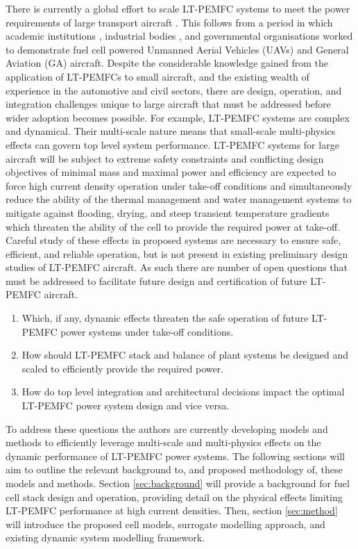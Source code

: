 There is currently a global effort to scale LT-PEMFC systems to meet the power requirements of large transport aircraft \cite{weeks_zeroavia_2025, retallack_commercial_2023, noauthor_newborn_nodate, wood_scalability_nodate}.
This follows from a period in which academic institutions \cite{kallo_fuel_2013}, industrial bodies \cite{lapena-rey_first_2010}, and governmental organisations \cite{noll2004investigation} worked to demonstrate fuel cell powered Unmanned Aerial Vehicles (UAVs) and General Aviation (GA) aircraft.
Despite the considerable knowledge gained from the application of LT-PEMFCs to small aircraft, and the existing wealth of experience in the automotive and civil sectors, there are  design, operation, and integration challenges unique to large aircraft that must be addressed before wider adoption becomes possible.
For example, LT-PEMFC systems are complex and dynamical.
Their multi-scale nature means that small-scale multi-physics effects can govern top level system performance.
LT-PEMFC systems for large aircraft will be subject to extreme safety constraints and conflicting design objectives of minimal mass and maximal power and efficiency are expected to force high current density operation under take-off conditions and simultaneously reduce the ability of the thermal management and water management systems to mitigate against flooding, drying, and steep transient temperature gradients which threaten the ability of the cell to provide the required power at take-off. Careful study of these effects in proposed systems are necessary to ensure safe, efficient, and reliable operation, but is not present in existing preliminary design studies of LT-PEMFC aircraft.
As such there are number of open questions that must be addressed to facilitate future design and certification of future LT-PEMFC aircraft.
\begin{enumerate}
	\item Which, if any, dynamic effects threaten the safe operation of future LT-PEMFC power systems under take-off conditions.
	\item How should LT-PEMFC stack and balance of plant systems be designed and scaled to efficiently provide the required power.
	\item How do top level integration and architectural decisions impact the optimal LT-PEMFC power system design and vice versa.
\end{enumerate}
To address these questions the authors are currently developing models and methods to efficiently leverage multi-scale and multi-physics effects on the dynamic performance of LT-PEMFC power systems.
The following sections will aim to outline the relevant background to, and proposed methodology of, these models and methods.
Section \ref{sec:background} will provide a background for fuel cell stack design and operation, providing detail on the physical effects limiting LT-PEMFC performance at high current densities.
Then, section \ref{sec:method} will introduce the proposed cell models, surrogate modelling approach, and existing dynamic system modelling framework.


